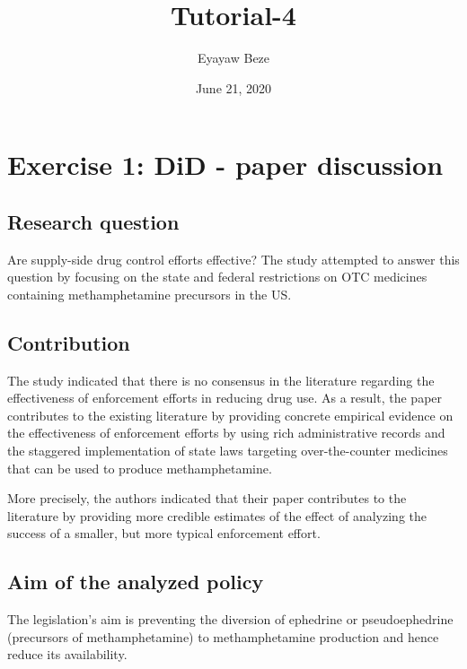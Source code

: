 \documentclass[
  11pt,
]{article}
\title{Tutorial-4}
\author{Eyayaw Beze}
\date{June 21, 2020}
\begin{document}
\maketitle

\hypertarget{exercise-1-did---paper-discussion}{%
\section{Exercise 1: DiD - paper
discussion}\label{exercise-1-did---paper-discussion}}

\hypertarget{research-question}{%
\subsection*{Research question}\label{research-question}}

Are supply-side drug control efforts effective? The study attempted to
answer this question by focusing on the state and federal restrictions
on OTC medicines containing methamphetamine precursors in the US.

\hypertarget{contribution}{%
\subsection*{Contribution}\label{contribution}}

The study indicated that there is no consensus in the literature
regarding the effectiveness of enforcement efforts in reducing drug use.
As a result, the paper contributes to the existing literature by
providing concrete empirical evidence on the effectiveness of
enforcement efforts by using rich administrative records and the
staggered implementation of state laws targeting over-the-counter
medicines that can be used to produce methamphetamine.

More precisely, the authors indicated that their paper contributes to
the literature by providing more credible estimates of the effect of
analyzing the success of a smaller, but more typical enforcement effort.

\hypertarget{aim-of-the-analyzed-policy}{%
\subsection*{Aim of the analyzed
policy}\label{aim-of-the-analyzed-policy}}

The legislation's aim is preventing the diversion of ephedrine or
pseudoephedrine (precursors of methamphetamine) to methamphetamine
production and hence reduce its availability.
\end{document}
